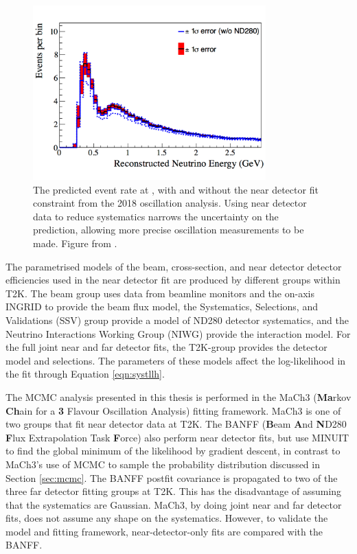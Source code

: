 \begin{figure}
\centering
\includegraphics*[width=0.8\textwidth,clip]{figs/NDConstraint}
\caption{The predicted event rate at \SK, with and without the near detector fit constraint from the 2018 oscillation analysis. Using near detector data to reduce systematics narrows the uncertainty on the prediction, allowing more precise oscillation measurements to be made. Figure from \cite{tn324}.}\label{fig:ndconstraint}
\end{figure}

The parametrised models of the beam, cross-section, and near detector detector efficiencies used in the near detector fit are produced by different groups within T2K. The beam group uses data from beamline monitors and the on-axis INGRID to provide the beam flux model, the Systematics, Selections, and Validations (SSV) group provide a model of ND280 detector systematics, and the Neutrino Interactions Working Group (NIWG) provide the interaction model. For the full joint near and far detector fits, the T2K-\SK group provides the \SK detector model and selections. The parameters of these models affect the log-likelihood in the fit through Equation \ref{eqn:systllh}.

The MCMC analysis presented in this thesis is performed in the MaCh3 (\textbf{Ma}rkov \textbf{Ch}ain for a \textbf{3} Flavour Oscillation Analysis) fitting framework. MaCh3 is one of two groups that fit near detector data at T2K. The BANFF (\textbf{B}eam \textbf{A}nd \textbf{N}D280 \textbf{F}lux Extrapolation Task \textbf{F}orce) also perform near detector fits, but use MINUIT\cite{minuit} to find the global minimum of the likelihood by gradient descent, in contrast to MaCh3's use of MCMC to sample the probability distribution discussed in Section \ref{sec:mcmc}. The BANFF postfit covariance is propagated to two of the three far detector fitting groups at T2K. This has the disadvantage of assuming that the systematics are Gaussian. MaCh3, by doing joint near and far detector fits, does not assume any shape on the systematics. However, to validate the model and fitting framework, near-detector-only fits are compared with the BANFF.

